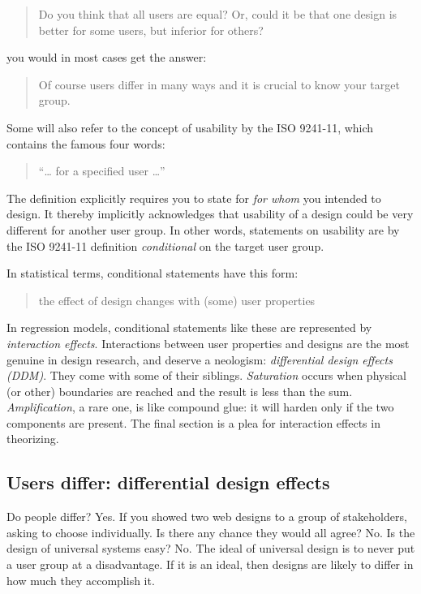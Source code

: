 \documentclass[]{svmono}
\begin{document}
\begin{quote}
Do you think that all users are equal? Or, could it be that one design
is better for some users, but inferior for others?
\end{quote}

you would in most cases get the answer:

\begin{quote}
Of course users differ in many ways and it is crucial to know your
target group.
\end{quote}

Some will also refer to the concept of usability by the ISO 9241-11,
which contains the famous four words:

\begin{quote}
``\ldots{} for a specified user \ldots{}''
\end{quote}

The definition explicitly requires you to state for \emph{for whom} you
intended to design. It thereby implicitly acknowledges that usability of
a design could be very different for another user group. In other words,
statements on usability are by the ISO 9241-11 definition
\emph{conditional} on the target user group.

In statistical terms, conditional statements have this form:

\begin{quote}
the effect of design changes with (some) user properties
\end{quote}

In regression models, conditional statements like these are represented
by \emph{interaction effects}. Interactions between user properties and
designs are the most genuine in design research, and deserve a
neologism: \emph{differential design effects (DDM)}. They come with some
of their siblings. \emph{Saturation} occurs when physical (or other)
boundaries are reached and the result is less than the sum.
\emph{Amplification}, a rare one, is like compound glue: it will harden
only if the two components are present. The final section is a plea for
interaction effects in theorizing.

\subsection{Users differ: differential design
effects}\label{differential_design_effects}

Do people differ? Yes. If you showed two web designs to a group of
stakeholders, asking to choose individually. Is there any chance they
would all agree? No. Is the design of universal systems easy? No. The
ideal of universal design is to never put a user group at a
disadvantage. If it is an ideal, then designs are likely to differ in
how much they accomplish it.
\end{document}
